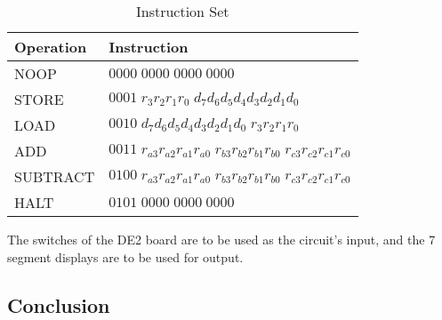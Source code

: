 \documentclass[12pt]{article}
\begin{document}
\begin{table}[htbp]
    \centering
    \begin{tabular}{ll}                                                                                                             \\\toprule
        \textbf{Operation}  & \textbf{Instruction}                                                                                  \\\midrule
        NOOP                & $0000 \; 0000 \; 0000 \; 0000$                                                                        \\
        STORE               & $0001 \; r_3 r_2 r_1 r_0 \; d_7 d_6 d_5 d_4 d_3 d_2 d_1 d_0$                                          \\
        LOAD                & $0010 \; d_7 d_6 d_5 d_4 d_3 d_2 d_1 d_0 \; r_3 r_2 r_1 r_0$                                          \\
        ADD                 & $0011 \; r_{a3} r_{a2} r_{a1} r_{a0} \; r_{b3} r_{b2} r_{b1} r_{b0} \; r_{c3} r_{c2} r_{c1} r_{c0}$   \\
        SUBTRACT            & $0100 \; r_{a3} r_{a2} r_{a1} r_{a0} \; r_{b3} r_{b2} r_{b1} r_{b0} \; r_{c3} r_{c2} r_{c1} r_{c0}$   \\
        HALT                & $0101 \; 0000 \; 0000 \; 0000$                                                                        \\\bottomrule
    \end{tabular}
    \caption{Instruction Set}
    \label{tab:instructions}
\end{table}

The switches of the DE2 board are to be used as the circuit’s input, and the 7 segment displays are to be used for output.

\FloatBarrier  \FloatBarrier \clearpage
\FloatBarrier  \FloatBarrier \clearpage
\FloatBarrier  \FloatBarrier \clearpage
\FloatBarrier  \FloatBarrier \clearpage
\FloatBarrier  \FloatBarrier \clearpage

\subsection*{Conclusion} 

\clearpage
\FloatBarrier 
\end{document}
